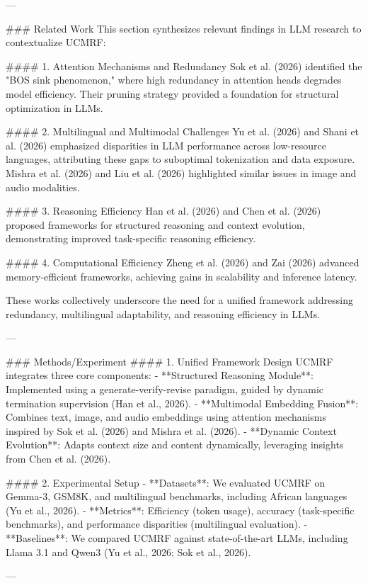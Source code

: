 ---

### Related Work
This section synthesizes relevant findings in LLM research to contextualize UCMRF:

#### 1. Attention Mechanisms and Redundancy
Sok et al. (2026) identified the "BOS sink phenomenon," where high redundancy in attention heads degrades model efficiency. Their pruning strategy provided a foundation for structural optimization in LLMs.

#### 2. Multilingual and Multimodal Challenges
Yu et al. (2026) and Shani et al. (2026) emphasized disparities in LLM performance across low-resource languages, attributing these gaps to suboptimal tokenization and data exposure. Mishra et al. (2026) and Liu et al. (2026) highlighted similar issues in image and audio modalities.

#### 3. Reasoning Efficiency
Han et al. (2026) and Chen et al. (2026) proposed frameworks for structured reasoning and context evolution, demonstrating improved task-specific reasoning efficiency.

#### 4. Computational Efficiency
Zheng et al. (2026) and Zai (2026) advanced memory-efficient frameworks, achieving gains in scalability and inference latency.

These works collectively underscore the need for a unified framework addressing redundancy, multilingual adaptability, and reasoning efficiency in LLMs.

---

### Methods/Experiment
#### 1. Unified Framework Design
UCMRF integrates three core components:
- **Structured Reasoning Module**: Implemented using a generate-verify-revise paradigm, guided by dynamic termination supervision (Han et al., 2026).
- **Multimodal Embedding Fusion**: Combines text, image, and audio embeddings using attention mechanisms inspired by Sok et al. (2026) and Mishra et al. (2026).
- **Dynamic Context Evolution**: Adapts context size and content dynamically, leveraging insights from Chen et al. (2026).

#### 2. Experimental Setup
- **Datasets**: We evaluated UCMRF on Gemma-3, GSM8K, and multilingual benchmarks, including African languages (Yu et al., 2026).
- **Metrics**: Efficiency (token usage), accuracy (task-specific benchmarks), and performance disparities (multilingual evaluation).
- **Baselines**: We compared UCMRF against state-of-the-art LLMs, including Llama 3.1 and Qwen3 (Yu et al., 2026; Sok et al., 2026).

---

